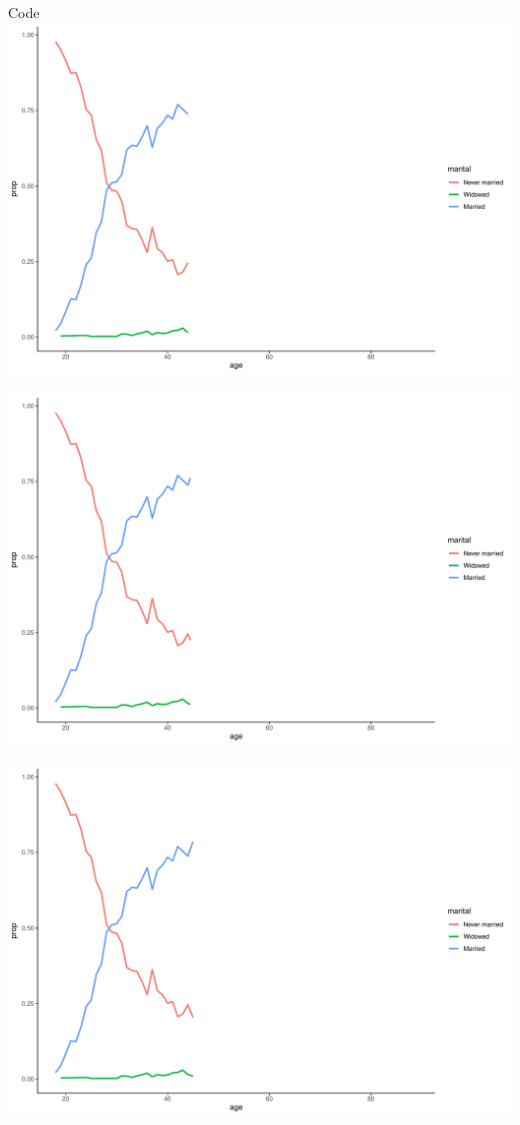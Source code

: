 \documentclass[
  ignorenonframetext,
]{beamer}
\begin{document}
\begin{frame}[fragile]{Code}
\includegraphics{gss_cat_files/figure-beamer/unnamed-chunk-1-41.pdf}

\includegraphics{gss_cat_files/figure-beamer/unnamed-chunk-1-42.pdf}

\includegraphics{gss_cat_files/figure-beamer/unnamed-chunk-1-43.pdf}


\end{frame}
\end{document}
